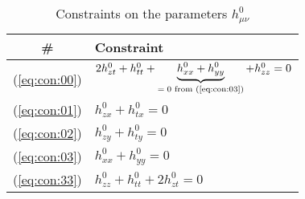 \documentclass[]{article}
\begin{document}
\begin{table}[H]
	\begin{center}
		\caption{Constraints on the parameters $h^0_{\mu\nu}$}\label{table:constraints}
		\begin{tabular}{|c|l|} \hline
			\#&Constraint\\ \hline
			(\ref{eq:con:00})&$2h^0_{zt}+h^0_{tt}+\underbrace{h^0_{xx}+h^0_{yy}}_\text{$=0$ from (\ref{eq:con:03})}+h^0_{zz} =0$\\ \hline
			(\ref{eq:con:01})&$h^0_{zx}+h^0_{tx}=0$\\ \hline
			(\ref{eq:con:02})&$h^0_{zy}+h^0_{ty}=0$\\ \hline
			(\ref{eq:con:03})&$h^0_{xx}+h^0_{yy}=0$\\ \hline
			(\ref{eq:con:33})&$h^0_{zz} + h^0_{tt} + 2h^0_{zt}=0$\\ \hline
		\end{tabular}
	\end{center}
\end{table}
	
	
	


\raggedright

\end{document}
